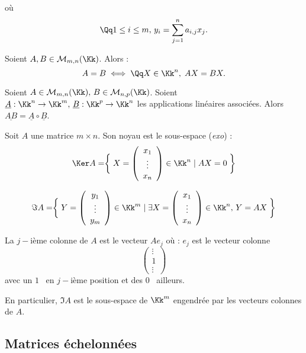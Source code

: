 \documentclass[class=report,crop=false]{standalone}
\begin{document}
où \[\Qq 1 \le i \le m ,\, y_i=\sum_{j=1}^na_{i,j}x_j .\]

\begin{remarque*}
Soient $A , B \in \mathcal{M}_{m,n}(\Kk)$. Alors :
\[A = B \iff \Qq X \in \Kk^n, \; AX = BX.\]
\end{remarque*}


\begin{exercicecours}
Soient $A \in \mathcal{M}_{m,n}(\Kk),\,B \in \mathcal{M}_{n,p}(\Kk)$. Soient $\underline{A} : \Kk^n \to \Kk^m,\, \underline{B} : \Kk^p \to \Kk^n$ les applications linéaires associées. Alors $\underline{AB} = \underline{A} \circ \underline{B}$.
\end{exercicecours}


\begin{definition}
Soit $A$ une matrice $m \times n$. Son noyau est le sous-espace ({\it exo}) :
\[\Ker A = \biggm\{ X= \left(\begin{array}{c}
x_1\\
\vdots\\
x_n
\end{array}\right) \in \Kk^n \mid AX = 0\biggm\}\] 


\[\Im A = \biggm\{ Y= \left(\begin{array}{c}
y_1\\
\vdots\\
y_m
\end{array}\right) \in \Kk^m \mid \exists X= \left(\begin{array}{c}
x_1\\
\vdots\\
x_n
\end{array}\right) \in \Kk^n ,\, Y=AX \biggm\}\]
\end{definition}

\begin{remarque*}
La $j-$ième colonne de $A$ est le vecteur $Ae_j$ où :
$e_j$ est le vecteur colonne \[\left(\begin{array}{c}
\vdots\\
1 \\\vdots
\end{array}\right)\]
avec un \og $1$ \fg\ en $j-$ième position et des \og $0$ \fg\ ailleurs.

En particulier, $\Im A$ est le sous-espace de $\Kk^m$ engendrée par les vecteurs colonnes de $A$.
\end{remarque*}


\subsection{Matrices échelonnées}
\end{document}
